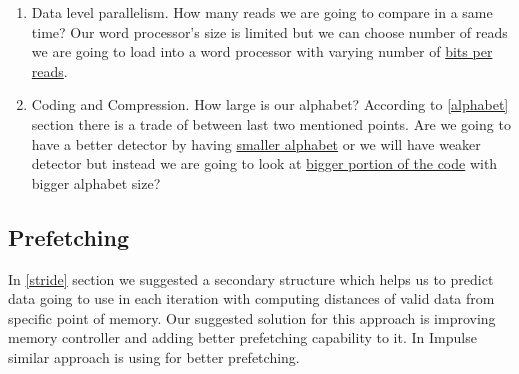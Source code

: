 \begin{enumerate}
\item Data level parallelism. How many reads we are going to compare in a same time? Our word processor's size is limited but we can choose number of reads we are going to load into a word processor with varying number of \underline{bits per reads}.
\item Coding and Compression. How large is our alphabet? According to \ref{alphabet} section there is a trade of between last two mentioned points. Are we going to have a better detector by having \underline{smaller alphabet} or we will have weaker detector but instead we are going to look at \underline{bigger portion of the code} with bigger alphabet size?
\end{enumerate}

\subsection{Prefetching}
In \ref{stride} section we suggested a secondary structure which helps us to predict data going to use in each iteration with computing distances of valid data from specific point of memory. Our suggested solution for this approach is improving memory controller and adding better prefetching capability to it. In Impulse \cite{impuls} similar approach is using for better prefetching.
  
  
  